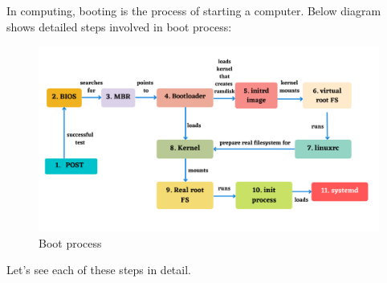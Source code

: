 \setlength{\columnsep}{3pt}
\begin{flushleft}

\bigskip

In computing, booting is the process of starting a computer.
\newline
Below diagram shows detailed steps involved in boot process:

\begin{figure}[h!]
	\centering
	\includegraphics[scale=0.5]{content/chapter17/images/bootprocess.png}
	\caption{Boot process}
	\label{fig:boot}
\end{figure}

Let's see each of these steps in detail.

\end{flushleft}
\newpage


